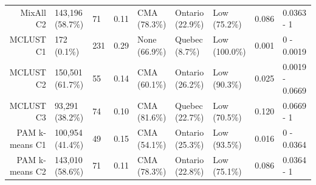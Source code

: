 \documentclass[11pt, a4paper]{article}
\begin{document}
\begin{table}[H]
{\begin{tabular}{|r|llllllll|}
  MixAll C2 & 143,196 (58.7\%) & 71 & 0.11 & CMA (78.3\%) & Ontario (22.9\%) & Low (75.2\%) & 0.086 & 0.0363 - 1 \\ 
\rowcolor{gray!25}  MCLUST C1 & 172 (0.1\%) & 231 & 0.29 & None (66.9\%) & Quebec (8.7\%) & Low (100.0\%) & 0.001 & 0 - 0.0019 \\ 
\rowcolor{gray!25}  MCLUST C2 & 150,501 (61.7\%) & 55 & 0.14 & CMA (60.1\%) & Ontario (26.2\%) & Low (90.3\%) & 0.025 & 0.0019 - 0.0669 \\ 
 \rowcolor{gray!25} MCLUST C3 & 93,291 (38.2\%) & 74 & 0.10 & CMA (81.6\%) & Quebec (22.7\%) & Low (70.5\%) & 0.120 & 0.0669 - 1 \\ 
  PAM k-means C1 & 100,954 (41.4\%) & 49 & 0.15 & CMA (54.1\%) & Ontario (25.3\%) & Low (93.5\%) & 0.016 & 0 - 0.0364 \\ 
  PAM k-means C2 & 143,010 (58.6\%) & 71 & 0.11 & CMA (78.3\%) & Ontario (22.8\%) & Low (75.1\%) & 0.086 & 0.0364 - 1 \\ 
   \hline
\end{tabular}
}
\end{table}
\end{document}
